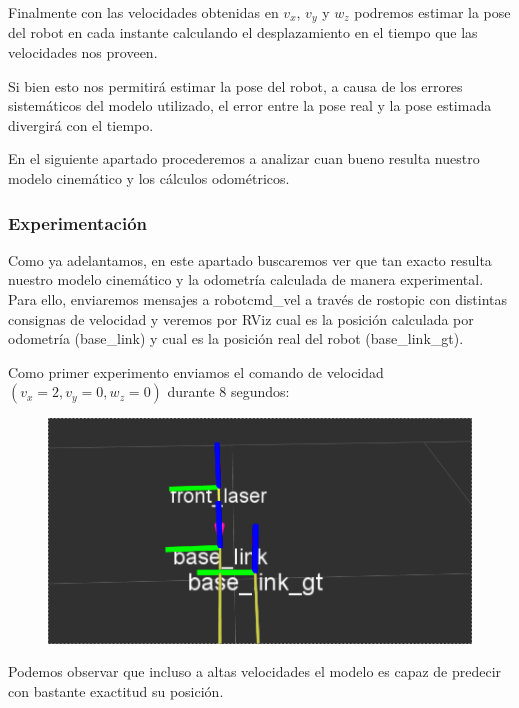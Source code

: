 Finalmente con las velocidades obtenidas en $v_x$, $v_y$ y $w_z$ podremos estimar la pose del robot en cada instante calculando el desplazamiento en el tiempo que las velocidades nos proveen.

Si bien esto nos permitirá estimar la pose del robot, a causa de los errores sistemáticos del modelo utilizado, el error entre la pose real y la pose estimada divergirá con el tiempo. 


En el siguiente apartado procederemos a analizar cuan bueno resulta nuestro modelo cinemático y los cálculos odométricos.

\subsubsection{Experimentación}

Como ya adelantamos, en este apartado buscaremos ver que tan exacto resulta nuestro modelo cinemático y la odometría calculada de manera experimental. Para ello, enviaremos mensajes a robot\/cmd\_vel a través de rostopic con distintas consignas de velocidad y veremos por RViz cual es la posición calculada por odometría (base\_link) y cual es la posición real del robot (base\_link\_gt). 


Como primer experimento enviamos el comando de velocidad $(v_x = 2, v_y=0, w_z=0)$ durante $8$ segundos:

\begin{center}
\begin{figure}[!htb]
\includegraphics[width=\linewidth]{pruebasOdom/8segAdelante2.png}
\end{figure}
\FloatBarrier
\end{center}

Podemos observar que incluso a altas velocidades el modelo es capaz de predecir con bastante exactitud su posición.

